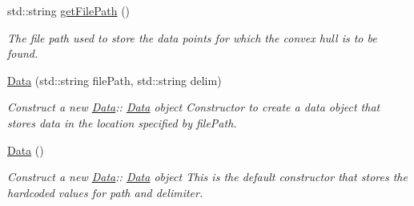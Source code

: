 \begin{DoxyCompactItemize}
std\+::string \hyperlink{classData_ac29a8b0190245be5f1cb5f650c16166b}{get\+File\+Path} ()
\begin{DoxyCompactList}\small\item\em The file path used to store the data points for which the convex hull is to be found. \end{DoxyCompactList}\item 
\hyperlink{classData_aa47da7ace142c56f5f4fc1109ec8f7b0}{Data} (std\+::string file\+Path, std\+::string delim)
\begin{DoxyCompactList}\small\item\em Construct a new \hyperlink{classData}{Data}\+:\+: \hyperlink{classData}{Data} object Constructor to create a data object that stores data in the location specified by file\+Path. \end{DoxyCompactList}\item 
\mbox{\label{classData_af11f741cb7f587e2e495452a8905a22a}} 
\hyperlink{classData_af11f741cb7f587e2e495452a8905a22a}{Data} ()
\begin{DoxyCompactList}\small\item\em Construct a new \hyperlink{classData}{Data}\+:\+: \hyperlink{classData}{Data} object This is the default constructor that stores the hardcoded values for path and delimiter. \end{DoxyCompactList}\end{DoxyCompactItemize}
